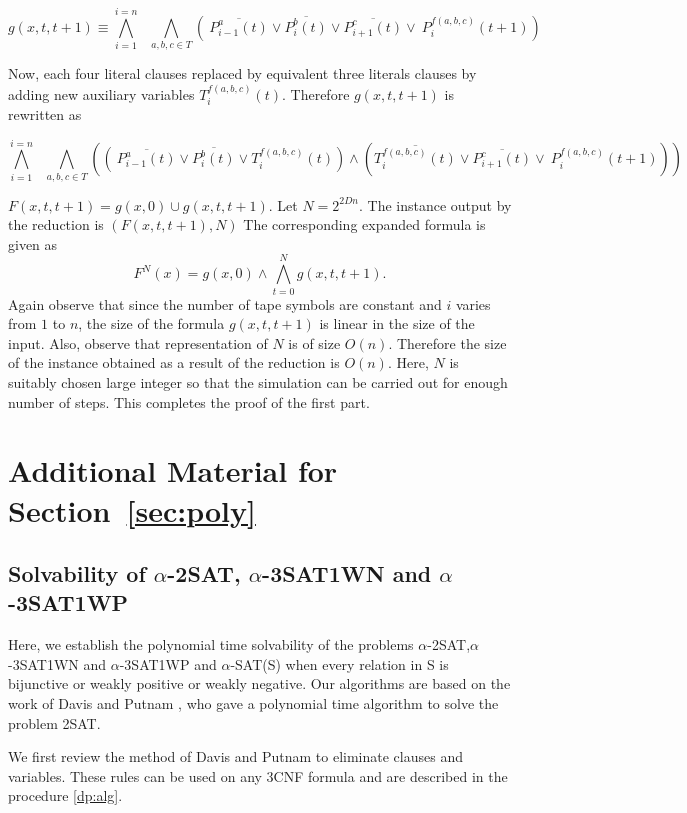 \[g(x, t,t+1) \equiv  \bigwedge_{i =1}^{ i = n} ~~~ \bigwedge_{a,b,c \in T} 
\left(~\overline{P_{i-1}^{a}(t)} \vee \overline{P_{i}^{b}(t)}
\vee \overline{P_{i+1}^{c}(t)}  \vee ~P_{i}^{f(a,b,c)}(t+1) \right) \]

Now, each four literal clauses replaced by equivalent three literals clauses
by adding new auxiliary variables $T^{f(a,b,c)}_{i}(t)$. Therefore
$g(x, t,t+1)$  is rewritten as 

\[ \bigwedge_{i =1}^{ i = n} ~~~ \bigwedge_{a,b,c \in T} 
\left(
\left(~\overline{P_{i-1}^{a}(t)} \vee \overline{P_{i}^{b}(t)}
\vee T_{i}^{f(a,b,c)}(t) \right)
\wedge 
\left( \overline{T_{i}^{f(a,b,c)}(t)} \vee
\overline{P_{i+1}^{c}(t)}  \vee ~P_{i}^{f(a,b,c)}(t+1) \right)\right) \]


$F(x,t,t+1) = g(x, 0) \cup g(x,t, t+1)$. Let $N = 2^{2Dn}$.
The instance output by the reduction is $(F(x,t, t+1), N)$
The corresponding expanded formula is given as 
\[ F^N(x) = g(x, 0) \wedge \bigwedge_{t = 0}^{N}g(x, t, t+1). \] 
Again observe that since the number of tape symbols are constant and $i$ 
varies  from $1$ to $n$,  
the size of the formula $g(x, t, t+1)$ is linear in the size of the input.
Also, observe that representation of $N$ is of size $O(n)$. Therefore
the size of the instance obtained as a result of the reduction is $O(n)$.
Here, 
$N$ is suitably chosen large integer so that the simulation can be carried 
out for enough number of steps. This completes the proof of the 
first part. \hfill\QED

\section{Additional Material for Section~\ref{sec:poly}}
\label{sec:appB}


\subsection{Solvability of $\alpha$-2SAT,
$\alpha$-{\sf 3SAT1WN} and $\alpha$-{\sf 3SAT1WP}}

Here, we establish the polynomial time solvability of the problems 
$\alpha$-{\sf 2SAT},$\alpha$-{\sf 3SAT1WN} and $\alpha$-{\sf 3SAT1WP} 
and $\alpha$-{\sf SAT(S)} 
when every relation in {\sf S} is bijunctive or weakly positive or 
weakly negative.
Our algorithms are based on the work of Davis and Putnam \cite{DP},
who gave a polynomial time algorithm to solve the problem {\sf 2SAT}.


We first review the method of Davis and Putnam\cite{DP} to eliminate clauses
and variables. These rules can be used on any {\sf 3CNF}  formula and 
are described  in the procedure \ref{dp:alg}.


